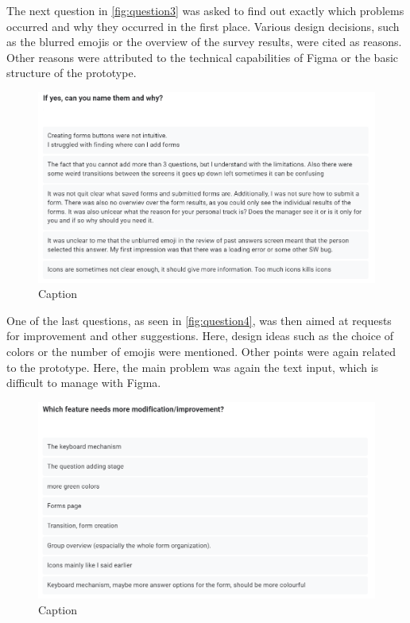 \documentclass[11pt]{article}
\begin{document}
The next question in \autoref{fig:question3} was asked to find out exactly which problems occurred and why they occurred in the first place. Various design decisions, such as the blurred emojis or the overview of the survey results, were cited as reasons. Other reasons were attributed to the technical capabilities of Figma or the basic structure of the prototype. 
\begin{figure}[h!]
    \centering
    \includegraphics[width = \textwidth]{figures/Question 4.PNG}
    \caption{Caption}
    \label{fig:question3}
\end{figure}
\clearpage
One of the last questions, as seen in \autoref{fig:question4}, was then aimed at requests for improvement and other suggestions. Here, design ideas such as the choice of colors or the number of emojis were mentioned. Other points were again related to the prototype. Here, the main problem was again the text input, which is difficult to manage with Figma.
\begin{figure}[h!]
    \centering
    \includegraphics[width = \textwidth]{figures/Question 5.PNG}
    \caption{Caption}
    \label{fig:question4}
\end{figure}
\end{document}
